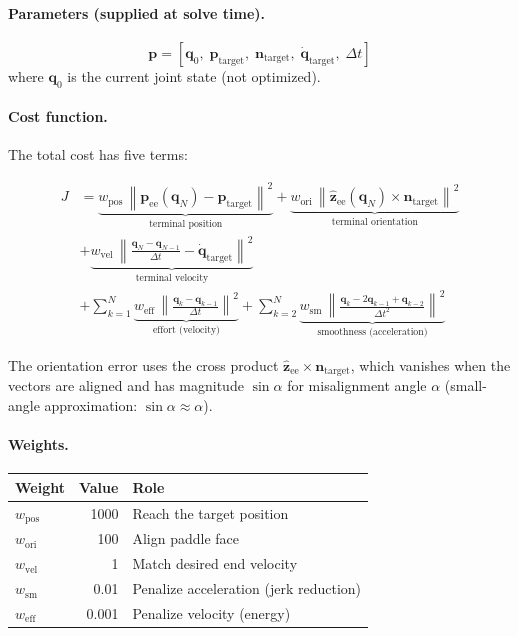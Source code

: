 \documentclass[11pt,letterpaper]{article}
\newcommand{\vv}[1]{\mathbf{#1}}
\newcommand{\norm}[1]{\left\|#1\right\|}
\begin{document}
\paragraph{Parameters (supplied at solve time).}
\begin{equation}
    \vv{p} = \left[\vv{q}_0,\; \vv{p}_{\text{target}},\; \vv{n}_{\text{target}},\; \dot{\vv{q}}_{\text{target}},\; \Delta t\right]
\end{equation}
where $\vv{q}_0$ is the current joint state (not optimized).

\paragraph{Cost function.}  The total cost has five terms:

\begin{align}
    J &= \underbrace{w_{\text{pos}}\,\norm{\vv{p}_{\text{ee}}(\vv{q}_N) - \vv{p}_{\text{target}}}^2}_{\text{terminal position}}
    + \underbrace{w_{\text{ori}}\,\norm{\hat{\vv{z}}_{\text{ee}}(\vv{q}_N) \times \vv{n}_{\text{target}}}^2}_{\text{terminal orientation}} \nonumber \\
    &+ \underbrace{w_{\text{vel}}\,\left\|\frac{\vv{q}_N - \vv{q}_{N-1}}{\Delta t} - \dot{\vv{q}}_{\text{target}}\right\|^2}_{\text{terminal velocity}} \nonumber \\[4pt]
    &+ \sum_{k=1}^{N} \underbrace{w_{\text{eff}}\,\left\|\frac{\vv{q}_k - \vv{q}_{k-1}}{\Delta t}\right\|^2}_{\text{effort (velocity)}}
    + \sum_{k=2}^{N} \underbrace{w_{\text{sm}}\,\left\|\frac{\vv{q}_k - 2\vv{q}_{k-1} + \vv{q}_{k-2}}{\Delta t^2}\right\|^2}_{\text{smoothness (acceleration)}}
    \label{eq:mpc_cost}
\end{align}

The orientation error uses the cross product $\hat{\vv{z}}_{\text{ee}} \times \vv{n}_{\text{target}}$, which vanishes when the vectors are aligned and has magnitude $\sin\alpha$ for misalignment angle $\alpha$ (small-angle approximation: $\sin\alpha \approx \alpha$).

\paragraph{Weights.}
\begin{table}[H]
\centering\small
\begin{tabular}{@{}lrl@{}}
\toprule
Weight & Value & Role \\
\midrule
$w_{\text{pos}}$ & 1000 & Reach the target position \\
$w_{\text{ori}}$ & 100 & Align paddle face \\
$w_{\text{vel}}$ & 1 & Match desired end velocity \\
$w_{\text{sm}}$ & 0.01 & Penalize acceleration (jerk reduction) \\
$w_{\text{eff}}$ & 0.001 & Penalize velocity (energy) \\
\bottomrule
\end{tabular}
\end{table}
\end{document}
